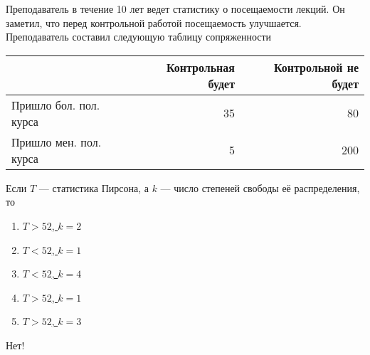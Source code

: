 \documentclass[t]{beamer}
\begin{document}
 \begin{frame} \label{47-No} 
\begin{block}{47} 

Преподаватель в течение 10 лет ведет статистику о посещаемости лекций. Он заметил, что перед контрольной работой посещаемость улучшается. Преподаватель составил следующую таблицу сопряженности

\small
\begin{tabular}{lrr}
	\toprule
	& Контрольная будет & Контрольной не будет \\
	\midrule
	Пришло бол. пол. курса & 35 & 80 \\
	Пришло мен. пол. курса & 5 & 200 \\
	\bottomrule
\end{tabular}

\vspace{5mm}
Если $T$ — статистика Пирсона, а $k$ — число степеней свободы её распределения, то


 \end{block} 
\begin{enumerate} 
\item[] \hyperlink{47-No}{\beamergotobutton{} $T>52$, $k=2$}
\item[] \hyperlink{47-No}{\beamergotobutton{} $T<52$, $k=1$}
\item[] \hyperlink{47-No}{\beamergotobutton{} $T<52$, $k=4$}
\item[] \hyperlink{47-Yes}{\beamergotobutton{} $T>52$, $k=1$}
\item[] \hyperlink{47-No}{\beamergotobutton{} $T>52$, $k=3$}
\end{enumerate} 

 \alert{Нет!} 
\end{frame} 
\end{document}
